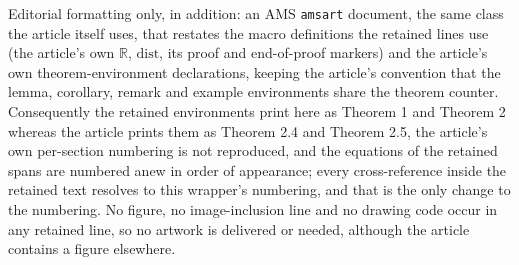 \documentclass[10pt,a4paper]{amsart}
\theoremstyle{plain}
\newcommand{\R}{\mathbb{R}}
\newcommand{\dist}{\textrm{dist}}
\begin{document}
Editorial formatting only, in addition: an AMS \texttt{amsart} document, the same class the article itself uses, that restates the macro definitions the retained lines use (the article's own $\R$, $\dist$, its proof and end-of-proof markers) and the article's own theorem-environment declarations, keeping the article's convention that the lemma, corollary, remark and example environments share the theorem counter. Consequently the retained environments print here as Theorem 1 and Theorem 2 whereas the article prints them as Theorem 2.4 and Theorem 2.5, the article's own per-section numbering is not reproduced, and the equations of the retained spans are numbered anew in order of appearance; every cross-reference inside the retained text resolves to this wrapper's numbering, and that is the only change to the numbering. No figure, no image-inclusion line and no drawing code occur in any retained line, so no artwork is delivered or needed, although the article contains a figure elsewhere.
\end{document}

